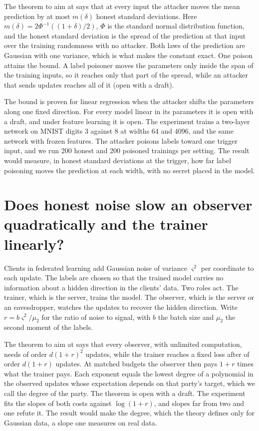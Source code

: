 \documentclass[10pt,a4paper]{article}
\begin{document}
The theorem to aim at says that at every input the attacker moves the mean prediction by at most $m(\delta)$ honest standard deviations. Here $m(\delta)=2\Phi^{-1}((1+\delta)/2)$, $\Phi$ is the standard normal distribution function, and the honest standard deviation is the spread of the prediction at that input over the training randomness with no attacker. Both laws of the prediction are Gaussian with one variance, which is what makes the constant exact. One poison attains the bound. A label poisoner moves the parameters only inside the span of the training inputs, so it reaches only that part of the spread, while an attacker that sends updates reaches all of it (open with a draft).

The bound is proven for linear regression when the attacker shifts the parameters along one fixed direction. For every model linear in its parameters it is open with a draft, and under feature learning it is open. The experiment trains a two-layer network on MNIST digits 3 against 8 at widths 64 and 4096, and the same network with frozen features. The attacker poisons labels toward one trigger input, and we run 200 honest and 200 poisoned trainings per setting. The result would measure, in honest standard deviations at the trigger, how far label poisoning moves the prediction at each width, with no secret placed in the model.

\section{Does honest noise slow an observer quadratically and the trainer linearly?}

Clients in federated learning add Gaussian noise of variance $\varsigma^2$ per coordinate to each update. The labels are chosen so that the trained model carries no information about a hidden direction in the clients' data. Two roles act. The trainer, which is the server, trains the model. The observer, which is the server or an eavesdropper, watches the updates to recover the hidden direction. Write $r=b\varsigma^2/\mu_2$ for the ratio of noise to signal, with $b$ the batch size and $\mu_2$ the second moment of the labels.

The theorem to aim at says that every observer, with unlimited computation, needs of order $d(1+r)^2$ updates, while the trainer reaches a fixed loss after of order $d(1+r)$ updates. At matched budgets the observer then pays $1+r$ times what the trainer pays. Each exponent equals the lowest degree of a polynomial in the observed updates whose expectation depends on that party's target, which we call the degree of the party. The theorem is open with a draft. The experiment fits the slopes of both costs against $\log(1+r)$, and slopes far from two and one refute it. The result would make the degree, which the theory defines only for Gaussian data, a slope one measures on real data.
\end{document}
